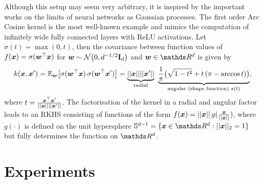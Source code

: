 Although this setup may seem very arbitrary, it is inspired by the important works on the limits of neural networks as Gaussian processes. The first order Arc Cosine kernel \citep{cho2009kernel} is the most well-known example and mimics the computation of infinitely wide fully connected layers with ReLU activations. Let $\sigma(t) = \max(0, t)$, then the covariance between function values of $f(\bm{x}) = \sigma(\bm{w}^\top \bm{x})$ for $\vw \sim \NormDist{0, d^{-1/2} \Eye_d}$ and $\vw \in \Reals^d$ is given by
\begin{equation}
\label{eq:arccosine}
    k(\vx, \vx') = \Exp{\vw}{\sigma(\vw^\top \vx)\, \sigma(\vw^\top \vx')} = \underbrace{\norm{\vx} \norm{\vx'}}_{\text{radial}}\ \underbrace{\frac{1}{\pi}\big( \sqrt{1 - t^2} + t\, (\pi - \arccos t) \big)}_{\text{angular (shape function) } s(t)},
\end{equation}
where $t = \frac{\bm{x}^\top \bm{x}'}{\lvert\lvert \bm{x}\rvert\rvert\lvert\lvert \bm{x}'\rvert\rvert}$. The factorisation of the kernel in a radial and angular factor leads to an RKHS consisting of functions of the form $f(\bm{x}) = \lvert\lvert \bm{x}\rvert\rvert\,g(\frac{\bm{x}}{\lvert\lvert \bm{x}\rvert\rvert})$, where $g(\cdot)$ is defined on the unit hypersphere $\dsphere = \{\vx \in \Reals^d: \norm{\vx}_2 = 1\}$ but fully determines the function on $\Reals^d$.



\section{Experiments}

